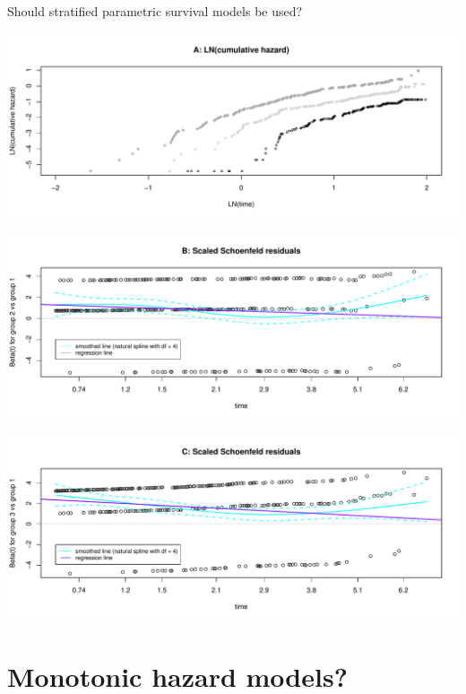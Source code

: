\documentclass[]{article}
\begin{document}
Should stratified parametric survival models be used?

\begin{flushleft}\includegraphics[height=0.29\textheight]{images/PH_assumption-1} \end{flushleft}

\begin{flushleft}\includegraphics[height=0.29\textheight]{images/PH_assumption-2} \end{flushleft}

\begin{flushleft}\includegraphics[height=0.29\textheight]{images/PH_assumption-3} \end{flushleft}

\newpage

\section{Monotonic hazard models?}\label{monotonic-hazard-models}
\end{document}
